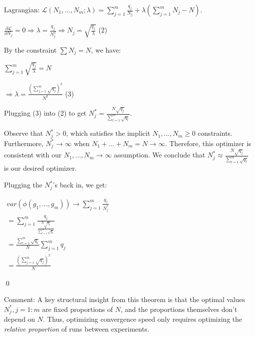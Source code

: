 \documentclass{article}
\begin{document}
Lagrangian: $\displaystyle \mathcal{L}\left( N_{1} ,...,N_{m} ;\lambda \right) =\sum _{j=1}^{m}\frac{q_{j}}{N_{j}} +\lambda \left(\sum _{j=1}^{m} N_{j} -N\right)$.

$\displaystyle \frac{\partial \mathcal{L}}{\partial N_{j}} =0\Longrightarrow \lambda =\frac{q_{j}}{N_{j}^{2}} \Longrightarrow N_{j} =\sqrt{\frac{q_{j}}{\lambda }}$ (2)

By the constraint $\displaystyle \sum N_{j} =N$, we have:

$\displaystyle \sum _{j=1}^{m}\sqrt{\frac{q_{j}}{\lambda }} =N$

$\displaystyle \Longrightarrow \lambda =\frac{\left(\sum _{j=1}^{m}\sqrt{q_{j}}\right)^{2}}{N^{2}}$ (3)

Plugging (3) into (2) to get $\displaystyle N_{j}^{*} =\frac{N\sqrt{q_{j}}}{\sum _{l=1}^{m}\sqrt{q_{l}}}$.

Observe that $\displaystyle N_{j}^{*}  >0$, which satisfies the implicit $\displaystyle N_{1} ,...,N_{m} \geqslant 0$ constraints. Furthermore, $\displaystyle N_{j}^{*}\rightarrow \infty $ when $\displaystyle N_{1} +...+N_{m} =N\rightarrow \infty $. Therefore, this optimizer is consistent with our $\displaystyle N_{1} ,...,N_{m}\rightarrow \infty $ assumption. We conclude that $\displaystyle N_{j}^{*} \approx \frac{N\sqrt{q_{j}}}{\sum _{l=1}^{m}\sqrt{q_{l}}}$ is our desired optimizer.



Plugging the $\displaystyle N_{j}^{*}$'s back in, we get:

$\displaystyle  \begin{array}{l}
var\left( \phi \left( g_{1} ,...,g_{m}\right)\right)\rightarrow \sum _{j=1}^{m}\frac{q_{j}}{N_{j}^{*}}\\
=\sum _{j=1}^{m}\frac{q_{j}}{\frac{N\sqrt{q_{j}}}{\sum _{l=1}^{m}\sqrt{q_{l}}}}\\
=\frac{\sum _{l=1}^{m}\sqrt{q_{l}}}{N}\sum _{j=1}^{m} q_{j}\\
=\frac{\left(\sum _{j=1}^{m}\sqrt{q_{j}}\right)^{2}}{N}
\end{array}$

\qed 



Comment: A key structural insight from this theorem is that the optimal values $\displaystyle N_{j}^{*} ,j=1:m$ are fixed proportions of $\displaystyle N$, and the proportions themselves don't depend on $\displaystyle N$. Thus, optimizing convergence speed only requires optimizing the \emph{relative proportion} of runs between experiments.
\end{document}
